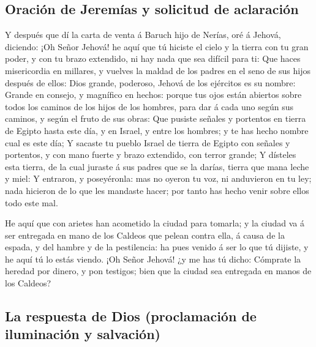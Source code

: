 \hypertarget{oraciuxf3n-de-jeremuxedas-y-solicitud-de-aclaraciuxf3n}{%
\subsection{Oración de Jeremías y solicitud de
aclaración}\label{oraciuxf3n-de-jeremuxedas-y-solicitud-de-aclaraciuxf3n}}

 Y después que dí la carta de venta á Baruch hijo de
Nerías, oré á Jehová, diciendo:  ¡Oh Señor Jehová! he aquí
que tú hiciste el cielo y la tierra con tu gran poder, y con tu brazo
extendido, ni hay nada que sea difícil para ti:  Que haces
misericordia en millares, y vuelves la maldad de los padres en el seno
de sus hijos después de ellos: Dios grande, poderoso, Jehová de los
ejércitos es su nombre:  Grande en consejo, y magnífico en
hechos: porque tus ojos están abiertos sobre todos los caminos de los
hijos de los hombres, para dar á cada uno según sus caminos, y según el
fruto de sus obras:  Que pusiste señales y portentos en
tierra de Egipto hasta este día, y en Israel, y entre los hombres; y te
has hecho nombre cual es este día;  Y sacaste tu pueblo
Israel de tierra de Egipto con señales y portentos, y con mano fuerte y
brazo extendido, con terror grande;  Y dísteles esta
tierra, de la cual juraste á sus padres que se la darías, tierra que
mana leche y miel:  Y entraron, y poseyéronla: mas no
oyeron tu voz, ni anduvieron en tu ley; nada hicieron de lo que les
mandaste hacer; por tanto has hecho venir sobre ellos todo este mal.

 He aquí que con arietes han acometido la ciudad para
tomarla; y la ciudad va á ser entregada en mano de los Caldeos que
pelean contra ella, á causa de la espada, y del hambre y de la
pestilencia: ha pues venido á ser lo que tú dijiste, y he aquí tú lo
estás viendo.  ¡Oh Señor Jehová! ¿y me has tú dicho:
Cómprate la heredad por dinero, y pon testigos; bien que la ciudad sea
entregada en manos de los Caldeos?

\hypertarget{la-respuesta-de-dios-proclamaciuxf3n-de-iluminaciuxf3n-y-salvaciuxf3n}{%
\subsection{La respuesta de Dios (proclamación de iluminación y
salvación)}\label{la-respuesta-de-dios-proclamaciuxf3n-de-iluminaciuxf3n-y-salvaciuxf3n}}


